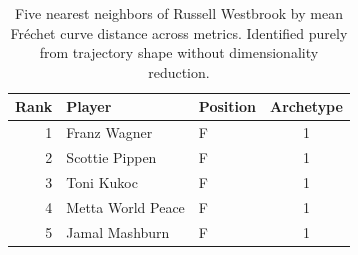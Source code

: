\begin{table}[htbp]
  \centering\small
  \begin{tabular}{rllc}
    \toprule
    Rank & Player & Position & Archetype \\
    \midrule
    1 & Franz Wagner & F & 1 \\
    2 & Scottie Pippen & F & 1 \\
    3 & Toni Kukoc & F & 1 \\
    4 & Metta World Peace & F & 1 \\
    5 & Jamal Mashburn & F & 1 \\
    \bottomrule
  \end{tabular}
  \caption{Five nearest neighbors of Russell Westbrook by mean Fr\'{e}chet curve distance across metrics. Identified purely from trajectory shape without dimensionality reduction.}
  \label{tab:Russell_Westbrook_frechet_curve_neighbors}
\end{table}

